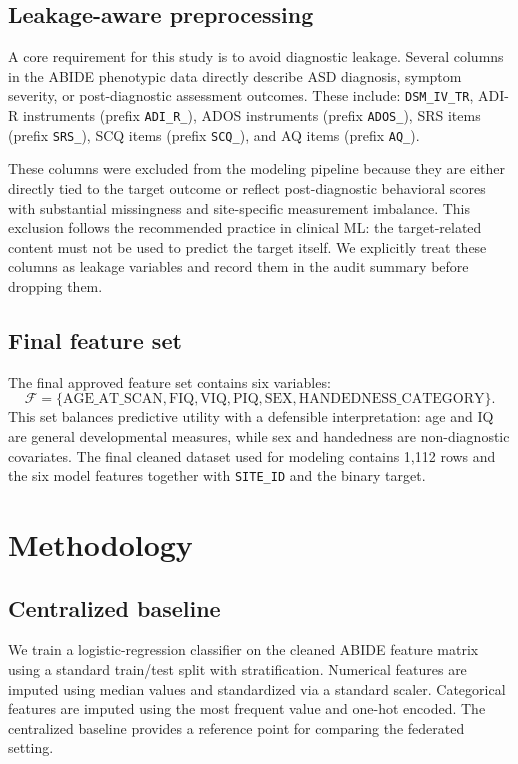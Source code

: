 \documentclass[sigconf]{acmart}
\begin{document}
\subsection{Leakage-aware preprocessing}
A core requirement for this study is to avoid diagnostic leakage. Several columns in the ABIDE phenotypic data directly describe ASD diagnosis, symptom severity, or post-diagnostic assessment outcomes. These include: \texttt{DSM\_IV\_TR}, ADI-R instruments (prefix \texttt{ADI\_R\_}), ADOS instruments (prefix \texttt{ADOS\_}), SRS items (prefix \texttt{SRS\_}), SCQ items (prefix \texttt{SCQ\_}), and AQ items (prefix \texttt{AQ\_}).

These columns were excluded from the modeling pipeline because they are either directly tied to the target outcome or reflect post-diagnostic behavioral scores with substantial missingness and site-specific measurement imbalance. This exclusion follows the recommended practice in clinical ML: the target-related content must not be used to predict the target itself. We explicitly treat these columns as leakage variables and record them in the audit summary before dropping them.

\subsection{Final feature set}
The final approved feature set contains six variables:
\begin{equation}
\mathcal{F} = \{\text{AGE\_AT\_SCAN}, \text{FIQ}, \text{VIQ}, \text{PIQ}, \text{SEX}, \text{HANDEDNESS\_CATEGORY}\}.
\end{equation}
This set balances predictive utility with a defensible interpretation: age and IQ are general developmental measures, while sex and handedness are non-diagnostic covariates. The final cleaned dataset used for modeling contains 1,112 rows and the six model features together with \texttt{SITE\_ID} and the binary target.

\section{Methodology}
\subsection{Centralized baseline}
We train a logistic-regression classifier on the cleaned ABIDE feature matrix using a standard train/test split with stratification. Numerical features are imputed using median values and standardized via a standard scaler. Categorical features are imputed using the most frequent value and one-hot encoded. The centralized baseline provides a reference point for comparing the federated setting.
\end{document}
